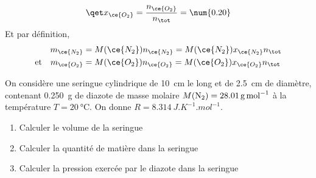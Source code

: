 \documentclass[a4paper, 10pt, final, garamond]{book}
\begin{document}
\begin{enumerate}[label=\sqenumi, leftmargin=10pt]
\begin{isd}
{\begin{gather*}
				\qet
				x_{\ce{O_2}} = \frac{n_{\ce{O_2}}}{n_{\tot}} = \num{0.20}
			\end{gather*}
			Et par définition,
			\begin{align*}
				m_{\ce{N_2}} & = M(\ce{N_2})n_{\ce{N_2}} = M(\ce{N_2})x_{\ce{N_2}}n_{\tot}
				\\\text{et}\quad
				m_{\ce{O_2}} & = M(\ce{O_2})n_{\ce{O_2}} = M(\ce{O_2})x_{\ce{O_2}}n_{\tot}
			\end{align*}
		}
		\tcblower
	\end{isd}
	On considère une seringue cylindrique de \SI{10}{cm} le long et de
	\SI{2.5}{cm} de diamètre, contenant \SI{0.250}{g} de diazote de masse
	molaire $M({\rm N}_2) = \SI{28.01}{g.mol^{-1}}$ à la
	température $T = \SI{20}{\degreeCelsius}$. On donne $R =
  \SI{8.314}{J.K^{-1}.mol^{-1}}$.
  \smallbreak
  \begin{isd}[sidebyside align=top]
    \begin{enumerate}
      \item Calculer le volume de la seringue
      \item Calculer la quantité de matière dans la seringue
      \item Calculer la pression exercée par le diazote dans la seringue
    \end{enumerate}
    \tcblower
		\wsw{
    \begin{enumerate}

\end{enumerate}}
\end{isd}
\end{enumerate}
\end{document}
